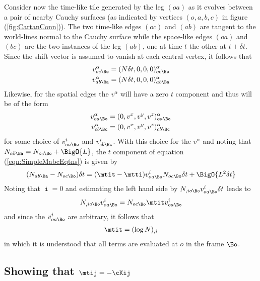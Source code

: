 \documentclass[a4paper,12pt]{article}
\numberwithin{equation}{section}
\begin{document}
Consider now the time-like tile generated by the leg $(oa)$ as it evolves between a pair of
nearby Cauchy surfaces (as indicated by vertices $(o,a,b,c)$ in figure
(\ref{fig:CartanConn})). The two time-like edges $(oc)$ and $(ab)$ are tangent to the
world-lines normal to the Cauchy surface while the space-like edges $(oa)$ and $(bc)$ are the
two instances of the leg $(ab)$, one at time $t$ the other at $t+\delta t$. Since the
shift vector is assumed to vanish at each central vertex, it follows that
\begin{align}
   v^\alpha_{oc\Bo} &= (N\delta t,0,0,0)^\alpha_{oc\Bo}\\
   v^\alpha_{ab\Ba} &= (N\delta t,0,0,0)^\alpha_{ab\Ba}
\end{align}
Likewise, for the spatial edges the $v^\alpha$ will have a zero $t$ component and thus
will be of the form
\begin{align}
   v^\alpha_{oa\Bo} &= (0,v^x,v^y,v^z)^\alpha_{oa\Bo}\\
   v^\alpha_{cb\Bc} &= (0,v^x,v^y,v^z)^\alpha_{cb\Bc}
\end{align}
for some choice of $v^i_{oa\Bo}$ and $v^i_{cb\Bc}$. With this choice for the $v^\alpha$ and
noting that $N_{ab\Ba}=N_{oc\Bo}+\BigO{L}$, the $t$ component of equation
(\ref{eqn:SimpleMabcEqtns}) is given by
\begin{align}
   (N_{ab\Ba} - N_{oc\Bo}) \delta t
      = (\mtit - \mtti) v^i_{oa\Bo} N_{oc\Bo} \delta t
      + \BigO{L^2\delta t}
\end{align}
Noting that $\mtti=0$ and estimating the left hand side by $N_{,io\Bo} v^i_{oa\Bo}\delta t$
leads to
\begin{align}
   N_{,io\Bo} v^i_{oa\Bo} = N_{oc\Bo}\mtit v^i_{oa\Bo}
\end{align}
and since the $v^i_{oa\Bo}$ are arbitrary, it follows that
\begin{align}
   \mtit = (\log N)_{,i}
\end{align}
in which it is understood that all terms are evaluated at $o$ in the frame $\Bo$.

\subsection*{Showing that $\mtij = -\cKij$}
\end{document}
